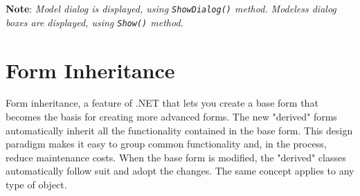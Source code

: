 \noindent \textbf{Note}: \emph{Model dialog is displayed, using \texttt{ShowDialog()} method. Modeless dialog boxes are displayed, using \texttt{Show()} method.}
%
%
%

\section{Form Inheritance}
Form inheritance, a feature of .NET that lets you create a base form that becomes the basis for
creating more advanced forms. The new "derived" forms automatically inherit all the
functionality contained in the base form. This design paradigm makes it easy to group common
functionality and, in the process, reduce maintenance costs. When the base form is modified, the
"derived" classes automatically follow suit and adopt the changes. The same concept applies to any
type of object.

